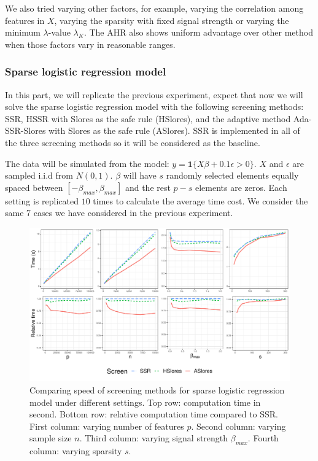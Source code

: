 We also tried varying other factors, for example, varying the correlation among features in $X$, varying the sparsity with fixed signal strength or varying the minimum $\lambda$-value $\lambda_K$. The AHR also shows uniform advantage over other method when those factors vary in reasonable ranges.

\subsubsection{Sparse logistic regression model}

In this part, we will replicate the previous experiment, expect that now we will solve the sparse logistic regression model with the following screening methods: SSR, HSSR with Slores as the safe rule (HSlores), and the adaptive method Ada-SSR-Slores with Slores as the safe rule (ASlores). SSR is implemented in all of the three screening methods so it will be considered as the baseline.

The data will be simulated from the model: $y=\mathbf{1}\{X\beta+0.1\epsilon >0\}$. $X$ and $\epsilon$ are sampled i.i.d from $N(0,1)$. $\beta$ will have $s$ randomly selected elements equally spaced between $[-\beta_{max},\beta_{max}]$ and the rest $p-s$ elements are zeros. Each setting is replicated $10$ times to calculate the average time cost. We consider the same 7 cases we have considered in the previous experiment.

\begin{figure}[h]
    \centering
    \includegraphics[scale = 0.59]{plots/512.pdf}    \caption{Comparing speed of screening methods for sparse logistic regression model under different settings. Top row: computation time in second. Bottom row: relative computation time compared to SSR. First column: varying number of features $p$. Second column: varying sample size $n$. Third column: varying signal strength $\beta_{max}$. Fourth column: varying sparsity $s$.}
    \label{fig:5.1.2a}
\end{figure}

